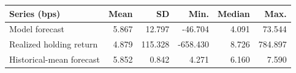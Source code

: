 \begin{tabular}{lrrrrr}
\toprule
Series (bps) & Mean & SD & Min. & Median & Max. \\
\midrule
Model forecast & 5.867 & 12.797 & -46.704 & 4.091 & 73.544 \\
Realized holding return & 4.879 & 115.328 & -658.430 & 8.726 & 784.897 \\
Historical-mean forecast & 5.852 & 0.842 & 4.271 & 6.160 & 7.590 \\
\bottomrule
\end{tabular}
